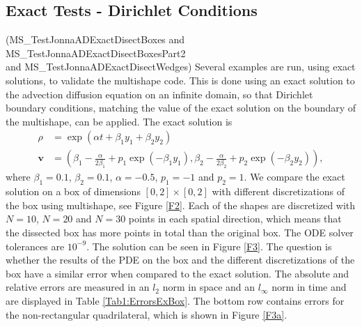 \documentclass[11pt, a4paper]{article}
\theoremstyle{definition}
\begin{document}
\subsection{Exact Tests - Dirichlet Conditions}
(MS\_TestJonnaADExactDisectBoxes and MS\_TestJonnaADExactDisectBoxesPart2\\ and MS\_TestJonnaADExactDisectWedges)
Several examples are run, using exact solutions, to validate the multishape code. This is done using an exact solution to the advection diffusion equation on an infinite domain, so that Dirichlet boundary conditions, matching the value of the exact solution on the boundary of the multishape, can be applied.
The exact solution is \cite{Hutomo_2019}
\begin{align*}
	\rho &= \exp(\alpha t + \beta_1 y_1 + \beta_2 y_2)\\
	\mathbf v &= \left(\beta_1 - \frac{\alpha}{2 \beta_1} + p_1\exp(-\beta_1 y_1) , \beta_2 - \frac{\alpha}{2 \beta_2} + p_2\exp(-\beta_2 y_2) \right),
\end{align*}
where $\beta_1 = 0.1$, $\beta_2 = 0.1$, $\alpha = -0.5$, $p_1 = -1$ and $p_2 = 1$.
We compare the exact solution on a box of dimensions $[0,2] \times [0,2] $ with different discretizations of the box using multishape, see Figure \ref{F2}. Each of the shapes are discretized with $N = 10$, $N = 20$ and $N = 30$ points in each spatial direction, which means that the dissected box has more points in total than the original box. The ODE solver tolerances are $10^{-9}$. The solution can be seen in Figure \ref{F3}. The question is whether the results of the PDE on the box and the different discretizations of the box have a similar error when compared to the exact solution. The absolute and relative errors are measured in an $l_2$ norm in space and an $l_\infty$ norm in time and are displayed in Table \ref{Tab1:ErrorsExBox}. The bottom row contains errors for the non-rectangular quadrilateral, which is shown in Figure \ref{F3a}. 
\end{document}
